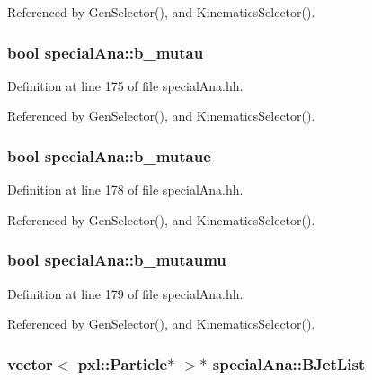 Referenced by Gen\-Selector(), and Kinematics\-Selector().

\subsubsection[{b\-\_\-mutau}]{\setlength{\rightskip}{0pt plus 5cm}bool special\-Ana\-::b\-\_\-mutau}\label{classspecialAna_ae6b84e17047e8a379fad795966129512}


Definition at line 175 of file special\-Ana.\-hh.



Referenced by Gen\-Selector(), and Kinematics\-Selector().

\subsubsection[{b\-\_\-mutaue}]{\setlength{\rightskip}{0pt plus 5cm}bool special\-Ana\-::b\-\_\-mutaue}\label{classspecialAna_a3b8dec739eeb3aba67512a275a740978}


Definition at line 178 of file special\-Ana.\-hh.



Referenced by Gen\-Selector(), and Kinematics\-Selector().

\subsubsection[{b\-\_\-mutaumu}]{\setlength{\rightskip}{0pt plus 5cm}bool special\-Ana\-::b\-\_\-mutaumu}\label{classspecialAna_a251c50e90dd2f85e67dac70abd219bf9}


Definition at line 179 of file special\-Ana.\-hh.



Referenced by Gen\-Selector(), and Kinematics\-Selector().

\subsubsection[{B\-Jet\-List}]{\setlength{\rightskip}{0pt plus 5cm}vector$<$ pxl\-::\-Particle$\ast$ $>$$\ast$ special\-Ana\-::\-B\-Jet\-List}\label{classspecialAna_a2978a50df2e166bb5475200bff24ffb2}


